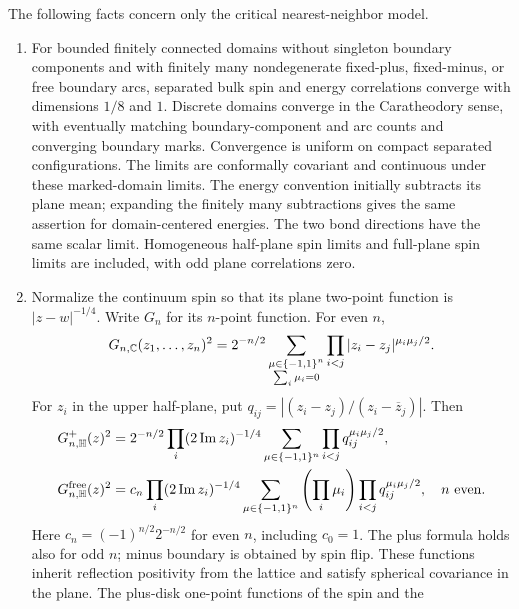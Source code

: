 \begin{proposition}\label{in:fields}
The following facts concern only the critical nearest-neighbor model.
\begin{enumerate}
\item\label{in:fields-convergence}
For bounded finitely connected domains without singleton boundary
components and with finitely many nondegenerate fixed-plus, fixed-minus,
or free boundary arcs, separated bulk spin and
energy correlations converge with dimensions $1/8$ and $1$. Discrete
domains converge in the Caratheodory sense, with eventually matching
boundary-component and arc counts and converging boundary marks.
Convergence is uniform on compact separated configurations. The limits
are conformally covariant and continuous under these marked-domain
limits. The energy convention initially subtracts its plane mean;
expanding the finitely many subtractions gives the same assertion for
domain-centered energies. The two bond directions have the same
scalar limit. Homogeneous half-plane spin limits and full-plane spin
limits are included, with odd plane correlations zero.
\item\label{in:fields-formulas}
Normalize the continuum spin so that its plane two-point function is
$|z-w|^{-1/4}$. Write $G_n$ for its $n$-point function. For even $n$,
\begin{equation}\label{in:plane-spin}
 G_{n,\mathbb C}(z_1,\ldots,z_n)^2
 =2^{-n/2}
   \sum_{\substack{\mu\in\{-1,1\}^n\\\sum_i\mu_i=0}}
       \prod_{i<j}|z_i-z_j|^{\mu_i\mu_j/2}.
\end{equation}
For $z_i$ in the upper half-plane, put
$q_{ij}=|(z_i-z_j)/(z_i-\overline z_j)|$. Then
\begin{align}
 G_{n,\mathbb H}^{+}(z)^2
 &=2^{-n/2}\prod_i(2\operatorname{Im}z_i)^{-1/4}
       \sum_{\mu\in\{-1,1\}^n}\prod_{i<j}q_{ij}^{\mu_i\mu_j/2},
       \label{in:halfplane-plus}\\
 G_{n,\mathbb H}^{\mathrm{free}}(z)^2
 &=c_n\prod_i(2\operatorname{Im}z_i)^{-1/4}
       \sum_{\mu\in\{-1,1\}^n}
          \left(\prod_i\mu_i\right)
          \prod_{i<j}q_{ij}^{\mu_i\mu_j/2},\quad n\ \hbox{even}.
       \label{in:halfplane-free}
\end{align}
Here $c_n=(-1)^{n/2}2^{-n/2}$ for even $n$, including $c_0=1$.
The plus formula holds also for odd $n$; minus boundary
is obtained by spin flip. These functions inherit reflection
positivity from the lattice and satisfy spherical covariance in the
plane. The plus-disk one-point functions of the spin and the

\end{enumerate}
\end{proposition}
